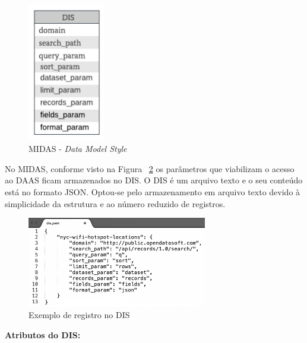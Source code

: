\documentclass[11pt,a4paper]{article}
\begin{document}
\begin{figure} [h!]
  \centering
    \includegraphics[width=0.3\textwidth]{MIDAS_-_Estilo_Modelo_Dados}
  \caption{MIDAS - \textit{Data Model Style}}
  \label{modelo}
\end{figure}

No MIDAS, conforme visto na Figura ~\ref{registro} os parâmetros que viabilizam o acesso ao DAAS ficam armazenados no DIS. O DIS é um arquivo texto e o seu conteúdo está no formato JSON. Optou-se pelo armazenamento em arquivo texto devido à simplicidade da estrutura e ao número reduzido de registros. 

\begin{figure} [h!]
  \centering
    \includegraphics[width=0.7\textwidth]{DIS-exemplo}
  \caption{Exemplo de registro no DIS}
  \label{registro}
\end{figure}

\textbf{Atributos do DIS:}
\end{document}
